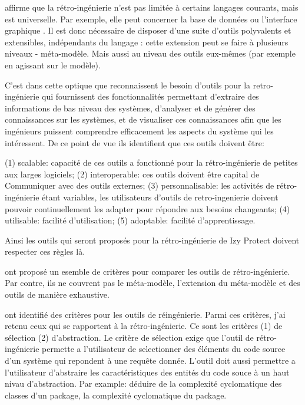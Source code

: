 \documentclass[a4paper]{article}
\begin{document}
\citet{Brun14c} affirme que la rétro-ingénierie n'est pas limitée à certains langages courants, mais est universelle. 
Par exemple, elle peut concerner la base de données \cite{Delp20a} ou l'interface graphique \cite{Verh19a}.
Il est donc nécessaire de disposer d'une suite d'outils polyvalents et extensibles, indépendants du langage : cette extension peut se faire à plusieurs niveaux - méta-modèle.
Mais aussi au niveau des outils eux-mêmes (par exemple en agissant sur le modèle).

C'est dans cette optique que \citet{Kien10a} reconnaissent  le besoin d'outils pour la retro-ingénierie qui fournissent des fonctionnalités permettant d'extraire des informations de bas niveau des systèmes, d'analyser et de générer des connaissances sur les systèmes, et de visualiser ces connaissances afin que les ingénieurs puissent comprendre efficacement les aspects du système qui les intéressent.
De ce point de vue ils identifient que ces outils doivent être:

  (1) scalable: capacité de ces outils a fonctionné pour la rétro-ingénierie de petites aux larges logiciels;
  (2) interoperable: ces outils doivent être capital de Communiquer avec des outils externes;
 (3) personnalisable: les activités de rétro-ingénierie étant variables, les utilisateurs d'outils de retro-ingenierie doivent pouvoir continuellement
 les  adapter pour répondre aux besoins changeants;
 (4) utilisable: facilité d'utilisation;
(5) adoptable: facilité d'apprentissage.

Ainsi les outils qui seront proposés pour la rétro-ingénierie de Izy Protect doivent respecter ces règles là.

\citet{Bell98a} ont proposé un esemble de critères pour comparer les outils de rétro-ingénierie.
Par contre, ils ne couvrent pas le méta-modèle, l'extension du méta-modèle et des outils de manière exhaustive.

\citet{Govi18a} ont identifié des critères pour les outils de réingénierie. 
Parmi ces critères, j'ai retenu ceux qui se rapportent à la rétro-ingénierie.
Ce sont les critères (1) de sélection (2) d'abstraction.  
Le critère de sélection exige que l'outil de rétro-ingénierie permette a l'utilisateur de selectionner des éléments  du code source d'un système 
qui repondent à une requête donnée.
L'outil doit aussi permettre a l'utilisateur d'abstraire les caractéristiques des entités du code souce à un haut nivau d'abstraction. 
Par example: déduire de la complexité cyclomatique des classes d'un package, la complexité cyclomatique du package.
\end{document}
